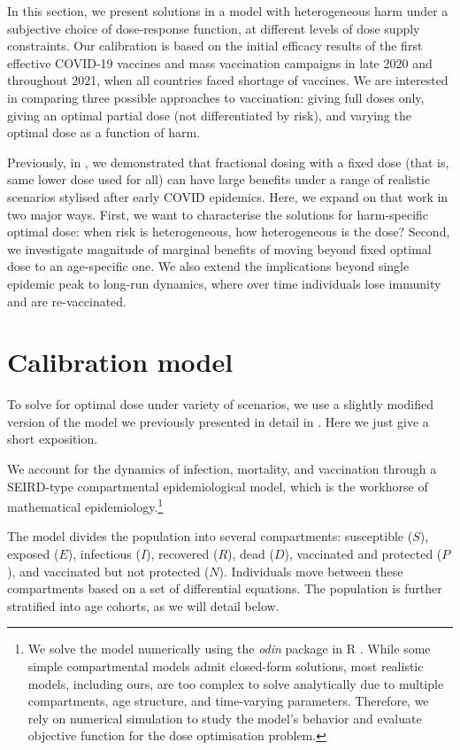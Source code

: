 \documentclass[12pt]{article}
\begin{document}
In this section, we present solutions in a model with heterogeneous harm under a subjective choice of dose-response function, at different levels of dose supply constraints. Our calibration is based on the initial efficacy results of the first effective COVID-19 vaccines and mass vaccination campaigns in late 2020 and throughout 2021, when all countries faced shortage of vaccines. We are interested in comparing three possible approaches to vaccination: giving full doses only, giving an optimal partial dose (not differentiated by risk), and varying the optimal dose as a function of harm.

Previously, in \cite{wiecek2021}, we demonstrated that fractional dosing with a fixed dose (that is, same lower dose used for all) can have large benefits under a range of realistic scenarios stylised after early COVID epidemics. Here, we expand on that work in two major ways. First, we want to characterise the solutions for harm-specific optimal dose: when risk is heterogeneous, how heterogeneous is the dose? Second, we investigate magnitude of marginal benefits of moving beyond fixed optimal dose to an age-specific one. We also extend the implications beyond single epidemic peak to long-run dynamics, where over time individuals lose immunity and are re-vaccinated.


\section{Calibration model}

To solve for optimal dose under variety of scenarios, we use a slightly modified version of the model we previously presented in detail in \cite{wiecek_2021}. Here we just give a short exposition. 

We account for the dynamics of infection, mortality, and vaccination through a SEIRD-type compartmental epidemiological model, which is the workhorse of mathematical epidemiology.\footnote{We solve the model numerically using the \textit{odin} package in R \cite{odin}. While some simple compartmental models admit closed-form solutions, most realistic models, including ours, are too complex to solve analytically due to multiple compartments, age structure, and time-varying parameters. Therefore, we rely on numerical simulation to study the model's behavior and evaluate objective function for the dose optimisation problem.} 

The model divides the population into several compartments: susceptible ($S$), exposed ($E$), infectious ($I$), recovered ($R$), dead ($D$), vaccinated and protected ($P$), and vaccinated but not protected ($N$). Individuals move between these compartments based on a set of differential equations. The population is further stratified into age cohorts, as we will detail below.
\end{document}
